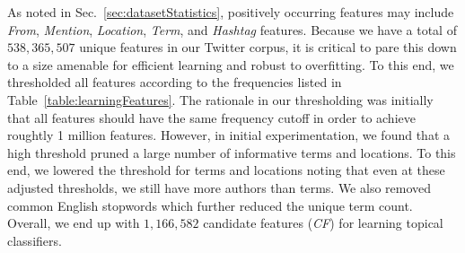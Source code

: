 As noted in Sec.~\ref{sec:datasetStatistics}, positively occurring
features %
may include
\textit{From}, \textit{Mention}, \textit{Location}, \textit{Term}, and \textit{Hashtag} features.
%
Because we have a total of $538,365,507$ unique features in our
Twitter corpus, it is critical to pare this down to a size amenable
for efficient learning and robust to overfitting.  To this end, we
thresholded all features according to the frequencies listed in
Table~\ref{table:learningFeatures}.  The rationale in our thresholding
was initially that all features should have the same frequency cutoff
in order to achieve roughtly 1 million features.  However, in 
initial experimentation, we found that a high threshold pruned a large
number of informative terms and locations.  To this end, we lowered
the threshold for terms and locations noting that even at these
adjusted thresholds, we still have more authors than terms.  We
also removed common English stopwords which further reduced the
unique term count.  Overall, we end up with $1,166,582$
candidate features (\textit{CF}) for learning topical classifiers.



